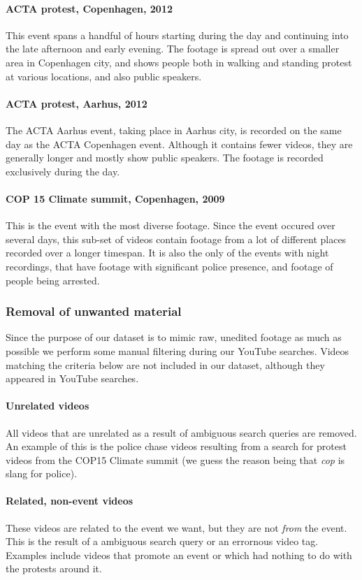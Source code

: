 \paragraph{ACTA protest, Copenhagen, 2012}
%
This event spans a handful of hours starting during the day and continuing into the late afternoon and early evening. The footage is spread out over a smaller area in Copenhagen city, and shows people both in walking and standing protest at various locations, and also public speakers.
%
\paragraph{ACTA protest, Aarhus, 2012}
%
The ACTA Aarhus event, taking place in Aarhus city, is recorded on the same day as the ACTA Copenhagen event. Although it contains fewer videos, they are generally longer and mostly show public speakers. The footage is recorded exclusively during the day.
%
\paragraph{COP 15 Climate summit, Copenhagen, 2009}
%
This is the event with the most diverse footage. Since the event occured over several days, this sub-set of videos contain footage from a lot of different places recorded over a longer timespan. It is also the only of the events with night recordings, that have footage with significant police presence, and footage of people being arrested.
%
\subsubsection{Removal of unwanted material}
%
Since the purpose of our dataset is to mimic raw, unedited footage as much as possible we perform some manual filtering during our YouTube searches. Videos matching the criteria below are not included in our dataset, although they appeared in YouTube searches.
%
\paragraph{Unrelated videos}
%
All videos that are unrelated as a result of ambiguous search queries are removed. An example of this is the police chase videos resulting from a search for protest videos from the COP15 Climate summit (we guess the reason being that \emph{cop} is slang for police).
%
\paragraph{Related, non-event videos}
%
These videos are related to the event we want, but they are not \emph{from} the event. This is the result of a ambiguous search query or an errornous video tag. Examples include videos that promote an event or which had nothing to do with the protests around it.
%
